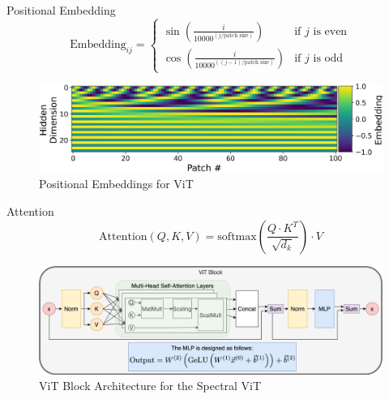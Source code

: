 \begin{frame}{Positional Embedding}
    \begin{equation}
        \text{Embedding}_{ij} = \begin{cases} \sin\left(\frac{i}{10000^{(j / \text{patch size})}}\right) & \text{if } j \text{ is even} \\
        \cos\left(\frac{i}{10000^{((j - 1) / \text{patch size})}}\right) & \text{if } j \text{ is odd}\end{cases}
    \end{equation}
    \pause
    \begin{figure}[t]
        \centering
        \includegraphics[width=.9\linewidth]{figures/embeddings_new.png}
        \caption{Positional Embeddings for ViT}
        \label{fig:embedding}
    \end{figure}
\end{frame}

\begin{frame}{Attention}
    \begin{equation}
        \label{eq:mhsa}
        \text{Attention}(Q, K, V) = \text{softmax}\left(\frac{Q\cdot K^T}{\sqrt{d_k}}\right)\cdot V
    \end{equation}
    \pause
    \begin{figure}
        \centering 
        \includegraphics[width=.9\textwidth]{figures/TransformerDiagrams/Attention_Presentation.png}
        \caption{ViT Block Architecture for the Spectral ViT}
        \label{fig:SpectralViTBlock}
    \end{figure}
\end{frame}

